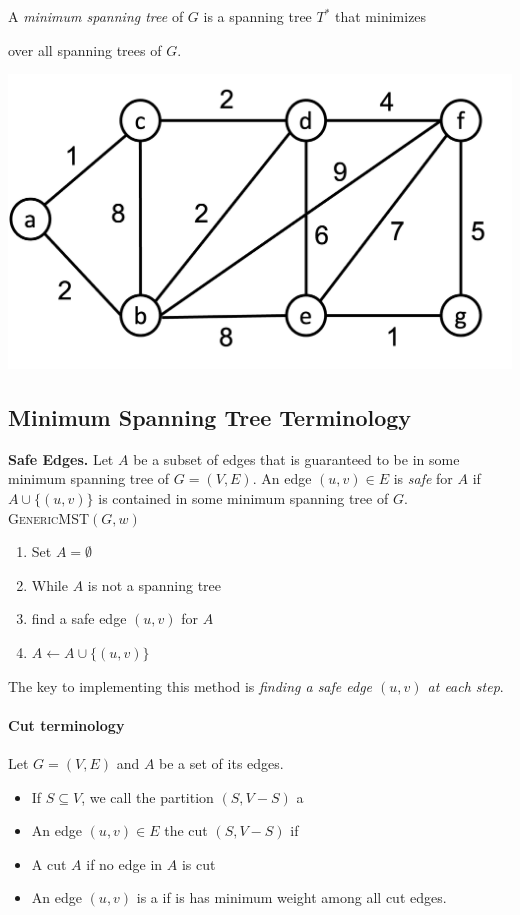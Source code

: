\documentclass[11  pt]{exam}
\begin{document}
A \emph{minimum spanning tree} of $G$ is a spanning tree $T^*$ that minimizes

\vs{2cm}
over all spanning trees of $G$.

\begin{center}
	\includegraphics[width = .5\linewidth]{mst-graph.png}
\end{center}

\newpage
\subsection{Minimum Spanning Tree Terminology}
\textbf{Safe Edges.} Let $A$ be a subset of edges that is guaranteed to be in some minimum spanning tree of $G = (V,E)$. An edge $(u,v) \in E$ is \emph{safe} for $A$ if $A\cup \{(u,v)\}$ is contained in some minimum spanning tree of $G$.\\

\textsc{GenericMST}$(G,w)$
\begin{enumerate}
	\item Set $A = \emptyset$
	\item While $A$ is not a spanning tree
	\item \;\;\; find a safe edge $(u,v)$ for $A$
	\item \;\;\; $A \leftarrow A \cup \{(u,v)\}$
\end{enumerate}

The key to implementing this method is \emph{finding a safe edge $(u,v)$ at each step}.\\

\paragraph{Cut terminology}
Let $G = (V,E)$ and $A$ be a set of its edges.
\begin{itemize}
	\item If $S \subseteq V$, we call the partition $(S, V-S)$ a \\
	\item An edge $(u,v) \in E$  the cut $(S, V-S)$ if  \\
	\item A cut  $A$ if no edge in $A$ is cut\\
	\item An edge $(u,v)$ is a  if is has minimum weight among all cut edges. 
\end{itemize}
\end{document}
